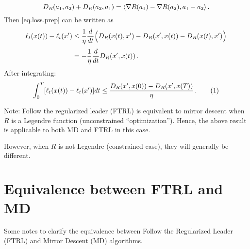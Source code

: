 \documentclass[12pt]{article}
\theoremstyle{plain}
\theoremstyle{definition}
\theoremstyle{remark}
\begin{document}
$$
D_{R}(a_{1}, a_{2}) + D_{R}(a_{2}, a_{1})
= \langle {\nabla R(a_{1}) - \nabla R(a_{2}), a_{1} - a_{2}}\rangle\,.
$$
Then \eqref{eq.loss.prep} can be written as
\begin{align*}
%
\ell_{t}(x(t)) - \ell_{t}(x')
&\leq  \frac{1}{\eta} \frac{d}{dt} \Bigl( D_{R}(x(t), x') - D_{R}(x', x(t)) - D_{R}(x(t), x')\Bigr) \\[1mm]
&= -\frac{1}{\eta} \frac{d}{dt} D_{R}(x', x(t))\,.
\end{align*}
After integrating:
\begin{align*}
%
\int_{0}^{T} [\ell_{t}(x(t)) - \ell_{t}(x')] dt 
\leq \frac{ D_{R}(x', x(0)) - D_{R}(x', x(T)) }{\eta}\,.
\addtocounter{equation}{1}
\label{eq.bound.first}  \tag{\theequation}
\end{align*}

Note: Follow the regularized leader (FTRL) is equivalent to mirror descent when $R$ is a Legendre function
(unconstrained ``optimization'').
Hence, the above result is applicable to both MD and FTRL in this case.

However, when $R$ is not Legendre (constrained case), they will generally be different.


\medskip


\section*{Equivalence between FTRL and MD}

Some notes to clarify the equivalence between 
Follow the Regularized Leader (FTRL) and Mirror Descent (MD) algorithms.

\medskip
\end{document}
